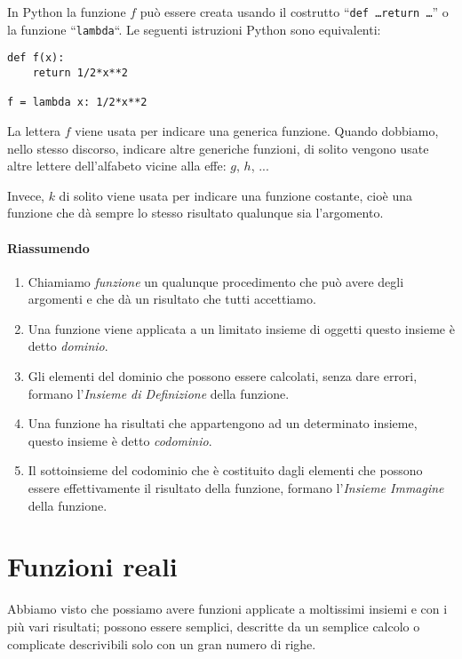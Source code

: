 In Python la funzione \(f\) può essere creata usando il costrutto 
``\texttt{def \dots return \dots}'' o la funzione ``\texttt{lambda}``.
Le seguenti istruzioni Python sono equivalenti:

\begin{lstlisting}
def f(x):
    return 1/2*x**2

f = lambda x: 1/2*x**2
\end{lstlisting}

\begin{osservazione}
La lettera \(f\) viene usata per indicare una generica funzione. 
Quando dobbiamo, nello stesso discorso, indicare altre generiche funzioni, 
di solito vengono usate altre lettere dell'alfabeto vicine alla effe: \(g\), 
\(h\), ...

Invece, \(k\) di solito viene usata per indicare una funzione costante, cioè 
una funzione che dà sempre lo stesso risultato qualunque sia l'argomento.
\end{osservazione}

\paragraph{Riassumendo}

\begin{enumerate} [noitemsep]
\item Chiamiamo \emph{funzione} un qualunque procedimento che può avere 
degli argomenti e che dà un risultato che tutti accettiamo.
\item Una funzione viene applicata a un limitato insieme di oggetti questo 
insieme è detto \emph{dominio}.
\item Gli elementi del dominio che possono essere calcolati, senza dare 
errori, formano l'\emph{Insieme di Definizione} della funzione.
\item Una funzione ha risultati che appartengono ad un determinato insieme, 
questo insieme è detto \emph{codominio}.
\item Il sottoinsieme del codominio che è costituito dagli elementi che 
possono essere effettivamente il risultato della funzione, formano 
l'\emph{Insieme Immagine} della funzione.
\end{enumerate}

\section{Funzioni reali}
\label{sec:funzioni2_reali}

Abbiamo visto che possiamo avere funzioni applicate a moltissimi insiemi e 
con i più vari risultati; possono essere semplici, descritte da un semplice 
calcolo o complicate descrivibili solo con un gran numero di righe.


